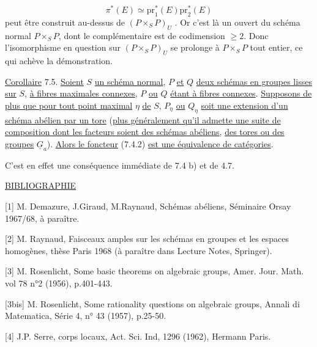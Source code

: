 \begin{equation*}
\pi^*(E) \simeq \mathrm{pr}_1^*(E)\mathrm{pr}_2^*(E)
\end{equation*}
peut être construit au-dessus de $(P \times_S P)_U$ . Or c'est là un ouvert du schéma normal $P \times_S P$, dont le complémentaire est de codimension $\geq 2$. Donc l'isomorphisme en question sur $(P \times_S P)_U$ se prolonge à $P \times_S P$ tout entier, ce qui achève la démonstration.

\underline{Corollaire} 7.5. \underline{Soient} $S$ \underline{un schéma normal}, $P$ \underline{et} $Q$ \underline{deux schémas en groupes lisses sur} $S$, \underline{à fibres maximales connexes}, $P$ \underline{ou} $Q$ \underline{étant à fibres connexes}. \underline{Supposons de plus que pour tout point maximal} $\eta$ \underline{de} $S$, $P_\eta$ \underline{ou} $Q_\eta$ \underline{soit une extension d'un schéma abélien par un tore} (\underline{plus généralement qu'il admette une suite de composition dont les facteurs soient des schémas abéliens}, \underline{des tores ou des groupes} $\underline{G}_a$). \underline{Alors le foncteur} (7.4.2) \underline{est une équivalence de catégories}.

C'est en effet une conséquence immédiate de 7.4 b) et de 4.7.


\underline{BIBLIOGRAPHIE}

[1] \quad M. Demazure, J.Giraud, M.Raynaud, Schémas abéliens, Séminaire Orsay 1967/68, à paraître.

[2] \quad M. Raynaud, Faisceaux amples sur les schémas en groupes et les espaces homogènes, thèse Paris 1968 (à paraître dans Lecture Notes, Springer).

[3] \quad M. Rosenlicht, Some basic theorems on algebraic groups, Amer. Jour. Math. vol 78 n°2 (1956), p.401-443.

[3bis] M. Rosenlicht, Some rationality questions on algebraic groups, Annali di Matematica, Série 4, n° 43 (1957), p.25-50.

[4] \quad J.P. Serre, corps locaux, Act. Sci. Ind, 1296 (1962), Hermann Paris.
